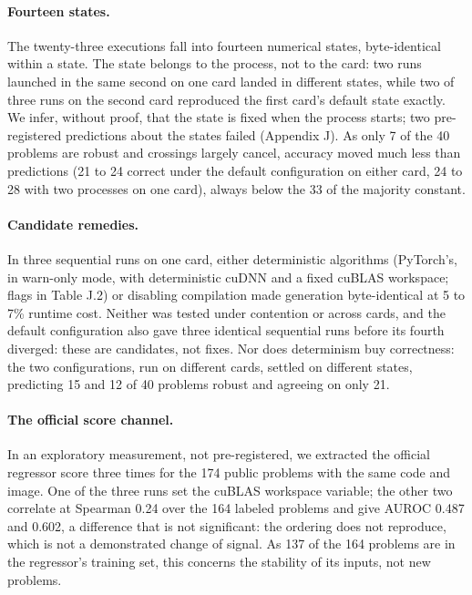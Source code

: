 \documentclass{article}
\begin{document}
\paragraph{Fourteen states.}
The twenty-three executions fall into fourteen numerical states, byte-identical within a state. The state belongs to the process, not to the card: two runs launched in the same second on one card landed in different states, while two of three runs on the second card reproduced the first card's default state exactly. We infer, without proof, that the state is fixed when the process starts; two pre-registered predictions about the states failed (Appendix J). As only 7 of the 40 problems are robust and crossings largely cancel, accuracy moved much less than predictions (21 to 24 correct under the default configuration on either card, 24 to 28 with two processes on one card), always below the 33 of the majority constant.

\paragraph{Candidate remedies.}
In three sequential runs on one card, either deterministic algorithms (PyTorch's, in warn-only mode, with deterministic cuDNN and a fixed cuBLAS workspace; flags in Table J.2) or disabling compilation made generation byte-identical at 5 to 7\% runtime cost. Neither was tested under contention or across cards, and the default configuration also gave three identical sequential runs before its fourth diverged: these are candidates, not fixes. Nor does determinism buy correctness: the two configurations, run on different cards, settled on different states, predicting 15 and 12 of 40 problems robust and agreeing on only 21.

\paragraph{The official score channel.}
In an exploratory measurement, not pre-registered, we extracted the official regressor score three times for the 174 public problems with the same code and image. One of the three runs set the cuBLAS workspace variable; the other two correlate at Spearman 0.24 over the 164 labeled problems and give AUROC 0.487 and 0.602, a difference that is not significant: the ordering does not reproduce, which is not a demonstrated change of signal. As 137 of the 164 problems are in the regressor's training set, this concerns the stability of its inputs, not new problems.
\end{document}
